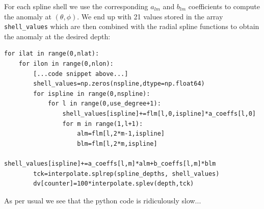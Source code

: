 For each spline shell we use the corresponding $a_{lm}$ and $b_{lm}$ coefficients to compute the 
anomaly at $(\theta,\phi)$. We end up with 21 values stored in the array {\tt shell\_values} 
which are then combined with the radial spline functions to obtain the anomaly at the desired depth:

\begin{lstlisting}
for ilat in range(0,nlat): 
    for ilon in range(0,nlon): 
        [...code snippet above...]
        shell_values=np.zeros(nspline,dtype=np.float64)  
        for ispline in range(0,nspline):
            for l in range(0,use_degree+1):
                shell_values[ispline]+=flm[l,0,ispline]*a_coeffs[l,0]
                for m in range(1,l+1):
                    alm=flm[l,2*m-1,ispline]
                    blm=flm[l,2*m,ispline]
                    shell_values[ispline]+=a_coeffs[l,m]*alm+b_coeffs[l,m]*blm
        tck=interpolate.splrep(spline_depths, shell_values)
        dv[counter]=100*interpolate.splev(depth,tck)
\end{lstlisting}

As per usual we see that the python code is ridiculously slow...


